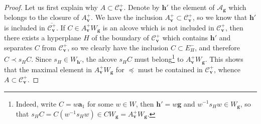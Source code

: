\documentclass[11pt]{amsart}
\theoremstyle{plain}
\theoremstyle{remark}
\numberwithin{equation}{section}
\begin{document}
	\begin{proof}
		Let us first explain why $A\subset \mathscr{C}^+_\mathbf{v}$. Denote by $\mathbf{h}'$ the element of $\mathcal{A}_\mathbf{g}$ which belongs to the closure of $A^+_\mathbf{v}$. We have the inclusion $A^+_\mathbf{v}\subset \mathscr{C}^+_\mathbf{v}$, so we know that $\mathbf{h}'$ is included in $\overline{\mathscr{C}^+_\mathbf{v}}$. If $C\in A^+_\mathbf{v}W_\mathbf{g}$ is an alcove which is not included in $\mathscr{C}^+_\mathbf{v}$, then there exists a hyperplane $H$ of the boundary of $\mathscr{C}^+_\mathbf{v}$ which contains $\mathbf{h}'$ and separates $C$ from $\mathscr{C}^+_{\mathbf{v}}$, so we clearly have the inclusion $C\subset E^-_H$, and therefore $C\prec s_HC$. Since $s_H\in W_{\mathbf{h}'}$, the alcove $s_HC$ must belong\footnote{Indeed, write $C=w\mathbf{a}_1$ for some $w\in W$, then  $\mathbf{h}'=w\mathbf{g}$ and $w^{-1}s_Hw\in W_\mathbf{g}$, so that $s_HC=C(w^{-1}s_Hw)\in CW_\mathbf{g}=A^+_\mathbf{v}W_\mathbf{g}$.} to $A^+_\mathbf{v}W_\mathbf{g}$. This shows that the maximal element in  $A^+_\mathbf{v}W_\mathbf{g}$ for $\preceq$ must be contained in $\mathscr{C}^+_\mathbf{v}$, whence $A\subset \mathscr{C}^+_\mathbf{v}$.
		

\end{proof}
\end{document}
